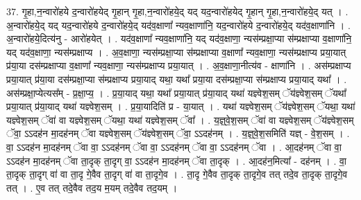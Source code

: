 \documentclass[17pt]{extarticle}
\begin{document}
37. गृ॒हा,न॒न्वारो॑हये द॒न्वारो॑हयेद् गृ॒हान् गृ॒हा,न॒न्वारो॑हये॒द् यद् यद॒न्वारो॑हयेद् गृ॒हान् गृ॒हा,न॒न्वारो॑हये॒द् यत् । . अ॒न्वारो॑हये॒द् यद् यद॒न्वारो॑हये द॒न्वारो॑हये॒द् यद॑व॒क्षाणा᳚ न्यव॒क्षाणा॑नि॒ यद॒न्वारो॑हये 
द॒न्वारो॑हये॒द् यद॑व॒क्षाणा॑नि । . अ॒न्वारो॑हये॒दित्य॑नु - आरो॑हयेत् । . यद॑व॒क्षाणा᳚ न्यव॒क्षाणा॑नि॒ यद् यद॑व॒क्षाणा॒ न्यस॑म्प्रक्षा॒प्या स॑म्प्रक्षाप्या व॒क्षाणा॑नि॒ यद् यद॑व॒क्षाणा॒ न्यस॑म्प्रक्षाप्य । . अ॒व॒क्षाणा॒ न्यस॑म्प्रक्षा॒प्या स॑म्प्रक्षाप्या व॒क्षाणा᳚ न्यव॒क्षाणा॒ न्यस॑म्प्रक्षाप्य प्रया॒यात् प्र॑या॒या दस॑म्प्रक्षाप्या व॒क्षाणा᳚ न्यव॒क्षाणा॒ न्यस॑म्प्रक्षाप्य प्रया॒यात् । . अ॒व॒क्षाणा॒नीत्य॑व - क्षाणा॑नि । . अस॑म्प्रक्षाप्य प्रया॒यात् प्र॑या॒या दस॑म्प्रक्षा॒प्या स॑म्प्रक्षाप्य प्रया॒याद् यथा॒ यथा᳚ 
प्रया॒या दस॑म्प्रक्षा॒प्या स॑म्प्रक्षाप्य प्रया॒याद् यथा᳚ । . अस॑म्प्रक्षा॒प्येत्यस᳚म् - प्र॒क्षा॒प्य॒ । . प्र॒या॒याद् यथा॒ यथा᳚ प्रया॒यात् प्र॑या॒याद् यथा॑ यज्ञ्वेश॒सम् ॅय॑ज्ञ्वेश॒सम् ॅयथा᳚ प्रया॒यात् 
प्र॑या॒याद् यथा॑ यज्ञ्वेश॒सम् । . प्र॒या॒यादिति॑ प्र - या॒यात् । . यथा॑ यज्ञ्वेश॒सम् ॅय॑ज्ञ्वेश॒सम् ॅयथा॒ यथा॑ यज्ञ्वेश॒सम् ॅवा॑ वा यज्ञ्वेश॒सम् ॅयथा॒ यथा॑ 
यज्ञ्वेश॒सम् ॅवा᳚ । . य॒ज्ञ्॒वे॒श॒सम् ॅवा॑ वा यज्ञ्वेश॒सम् ॅय॑ज्ञ्वेश॒सम् ॅवा॒ ऽऽदह॑न मा॒दह॑नम् ॅवा यज्ञ्वेश॒सम् ॅय॑ज्ञ्वेश॒सम् ॅवा॒ ऽऽदह॑नम् । . य॒ज्ञ्॒वे॒श॒समिति॑ यज्ञ् - वे॒श॒सम् । . वा॒ ऽऽदह॑न मा॒दह॑नम् ॅवा वा॒ ऽऽदह॑नम् ॅवा वा॒ ऽऽदह॑नम् ॅवा वा॒ ऽऽदह॑नम् ॅवा । . आ॒दह॑नम् ॅवा वा॒ ऽऽदह॑न मा॒दह॑नम् ॅवा ता॒दृक् ता॒दृग् वा॒ ऽऽदह॑न मा॒दह॑नम् ॅवा ता॒दृक् । . आ॒दह॑न॒मित्या᳚ - दह॑नम् । . वा॒ ता॒दृक् ता॒दृग् वा॑ वा ता॒दृ गे॒वैव ता॒दृग् वा॑ वा ता॒दृगे॒व । . ता॒दृ गे॒वैव ता॒दृक् ता॒दृगे॒व तत् तदे॒व ता॒दृक् ता॒दृगे॒व तत् । . ए॒व तत् तदे॒वैव तद॒य म॒यम् तदे॒वैव तद॒यम् । \newline
\end{document}
